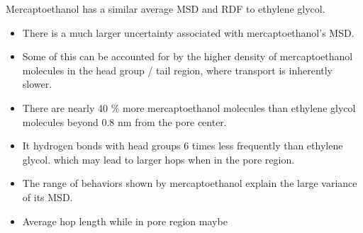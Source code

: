 \documentclass{article}
\begin{document}
  \noindent Mercaptoethanol has a similar average MSD and RDF to ethylene glycol.
  \begin{itemize}
    \item There is a much larger uncertainty associated with mercaptoethanol's MSD.
    \item Some of this can be accounted for by the higher density of mercaptoethanol 
    molecules in the head group / tail region, where transport is inherently slower. 
    \item There are nearly 40 \% more mercaptoethanol molecules than ethylene 
    glycol molecules beyond 0.8 nm from the pore center. 
    \item It hydrogen bonds with head groups 6 times less frequently than ethylene glycol.
    which may lead to larger hops when in the pore region.
    \item The range of behaviors shown by mercaptoethanol explain the large variance
    of its MSD.
    \item Average hop length while in pore region maybe %
  \end{itemize}
  
  
  
\end{document}
